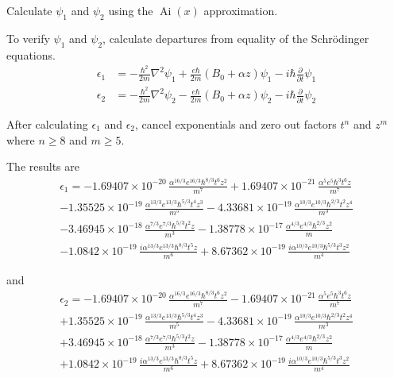 Calculate $\psi_1$ and $\psi_2$ using the $\operatorname{Ai}(x)$ approximation.

\bigskip
To verify $\psi_1$ and $\psi_2$,
calculate departures from equality of the Schr\"odinger equations.
\begin{align*}
\epsilon_1&=-\frac{\hbar^2}{2m}\nabla^2\psi_1
+\frac{e\hbar}{2m}(B_0+\alpha z)\psi_1
-i\hbar\frac{\partial}{\partial t}\psi_1
\\[1ex]
\epsilon_2&=-\frac{\hbar^2}{2m}\nabla^2\psi_2
-\frac{e\hbar}{2m}(B_0+\alpha z)\psi_2
-i\hbar\frac{\partial}{\partial t}\psi_2
\end{align*}

After calculating $\epsilon_1$ and $\epsilon_2$, cancel exponentials and
zero out factors $t^n$ and $z^m$ where $n\ge8$ and $m\ge5$.

\bigskip
The results are
\begin{multline*}
\epsilon_1
 = -1.69407\times\boxed{10^{-20}}\,\frac{ \alpha^{16/3} e^{16/3} \hbar^{8/3} t^6 z^2}{m^7}
 + 1.69407\times\boxed{10^{-21}}\,\frac{ \alpha^5 e^5 \hbar^3 t^6 z}{m^7}
 \\
 - 1.35525\times\boxed{10^{-19}}\,\frac{ \alpha^{13/3} e^{13/3} \hbar^{5/3} t^4 z^3}{m^5}
 - 4.33681\times\boxed{10^{-19}}\,\frac{ \alpha^{10/3} e^{10/3} \hbar^{2/3} t^2 z^4}{m^3}
 \\
 - 3.46945\times\boxed{10^{-18}}\,\frac{ \alpha^{7/3} e^{7/3} \hbar^{5/3} t^2 z}{m^3}
 - 1.38778\times\boxed{10^{-17}}\,\frac{ \alpha^{4/3} e^{4/3} \hbar^{2/3} z^2}{m}
 \\
 - 1.0842\times\boxed{10^{-19}}\,\frac{ i \alpha^{13/3} e^{13/3} \hbar^{8/3} t^5 z}{m^6}
 + 8.67362\times\boxed{10^{-19}}\,\frac{ i \alpha^{10/3} e^{10/3} \hbar^{5/3} t^3 z^2}{m^4}
\end{multline*}

and
\begin{multline*}
\epsilon_2
 = -1.69407\times\boxed{10^{-20}}\,\frac{ \alpha^{16/3} e^{16/3} \hbar^{8/3} t^6 z^2}{m^7}
 - 1.69407\times\boxed{10^{-21}}\,\frac{ \alpha^5 e^5 \hbar^3 t^6 z}{m^7}
 \\
 + 1.35525\times\boxed{10^{-19}}\,\frac{ \alpha^{13/3} e^{13/3} \hbar^{5/3} t^4 z^3}{m^5}
 - 4.33681\times\boxed{10^{-19}}\,\frac{ \alpha^{10/3} e^{10/3} \hbar^{2/3} t^2 z^4}{m^3}
 \\
 + 3.46945\times\boxed{10^{-18}}\,\frac{ \alpha^{7/3} e^{7/3} \hbar^{5/3} t^2 z}{m^3}
 - 1.38778\times\boxed{10^{-17}}\,\frac{ \alpha^{4/3} e^{4/3} \hbar^{2/3} z^2}{m}
 \\
 + 1.0842\times\boxed{10^{-19}}\,\frac{ i \alpha^{13/3} e^{13/3} \hbar^{8/3} t^5 z}{m^6}
 + 8.67362\times\boxed{10^{-19}}\,\frac{ i \alpha^{10/3} e^{10/3} \hbar^{5/3} t^3 z^2}{m^4}
\end{multline*}

